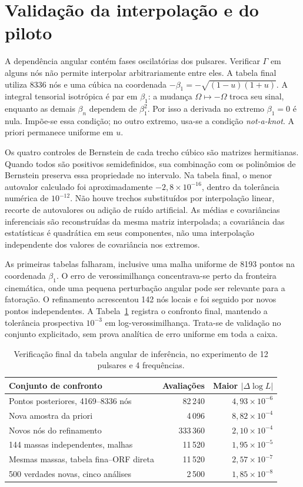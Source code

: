 \section{Validação da interpolação e do piloto}

A dependência angular contém fases oscilatórias dos pulsares. Verificar
\(\Gamma\) em alguns nós não permite interpolar arbitrariamente entre eles.
A tabela final utiliza 8336 nós e uma cúbica na coordenada
\(-\beta_1=-\sqrt{(1-u)(1+u)}\). A integral tensorial isotrópica é par em
\(\beta_1\): a mudança \(\Omega\mapsto-\Omega\) troca seu sinal, enquanto
as demais \(\beta_n\) dependem de \(\beta_1^2\). Por isso a derivada no
extremo \(\beta_1=0\) é nula. Impõe-se essa condição; no outro extremo,
usa-se a condição \textit{not-a-knot}. A priori permanece uniforme em \(u\).

Os quatro controles de Bernstein de cada trecho cúbico são matrizes
hermitianas. Quando todos são positivos semidefinidos, sua combinação
com os polinômios de Bernstein preserva essa propriedade no intervalo.
Na tabela final, o menor autovalor calculado foi aproximadamente
\(-2{,}8\times10^{-16}\), dentro da tolerância numérica de \(10^{-12}\).
Não houve trechos substituídos por interpolação linear, recorte de
autovalores ou adição de ruído artificial. As médias e covariâncias
inferenciais são reconstruídas da mesma matriz interpolada; a covariância
das estatísticas é quadrática em seus componentes, não uma interpolação
independente dos valores de covariância nos extremos.

As primeiras tabelas falharam, inclusive uma malha uniforme de 8193 pontos
na coordenada \(\beta_1\). O erro de verossimilhança concentrava-se perto
da fronteira cinemática, onde uma pequena perturbação angular pode ser
relevante para a fatoração. O refinamento acrescentou 142 nós locais e
foi seguido por novos pontos independentes. A Tabela~\ref{tab:inf-orf}
registra o confronto final, mantendo a tolerância prospectiva
\(10^{-3}\) em log-verossimilhança. Trata-se de validação no conjunto
explicitado, sem prova analítica de erro uniforme em toda a caixa.

\begin{table}[htbp]
\centering
\caption{Verificação final da tabela angular de inferência, no experimento de 12 pulsares e 4 frequências.}
\label{tab:inf-orf}
\begin{tabular}{lrr}
\toprule
Conjunto de confronto & Avaliações & Maior \(\lvert\Delta\log L\rvert\)\\
\midrule
Pontos posteriores, 4169--8336 nós & 82\,240 & \(4{,}93\times10^{-6}\)\\
Nova amostra da priori & 4\,096 & \(8{,}82\times10^{-4}\)\\
Novos nós do refinamento & 333\,360 & \(2{,}10\times10^{-4}\)\\
144 massas independentes, malhas & 11\,520 & \(1{,}95\times10^{-5}\)\\
Mesmas massas, tabela fina--ORF direta & 11\,520 & \(2{,}57\times10^{-7}\)\\
500 verdades novas, cinco análises & 2\,500 & \(1{,}85\times10^{-8}\)\\
\bottomrule
\end{tabular}
\end{table}

